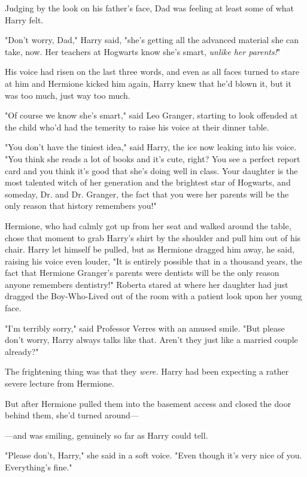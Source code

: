 Judging by the look on his father's face, Dad was feeling at least some of what 
Harry felt.

"Don't worry, Dad," Harry said, "she's getting all the advanced material she 
can take, now. Her teachers at Hogwarts know she's smart, \emph{unlike her 
parents!}"

His voice had risen on the last three words, and even as all faces turned to 
stare at him and Hermione kicked him again, Harry knew that he'd blown it, but 
it was too much, just way too much.

"Of course we know she's smart," said Leo Granger, starting to look offended at 
the child who'd had the temerity to raise his voice at their dinner table.

"You don't have the tiniest idea," said Harry, the ice now leaking into his 
voice. "You think she reads a lot of books and it's cute, right? You see a 
perfect report card and you think it's good that she's doing well in class. 
Your daughter is the most talented witch of her generation and the brightest 
star of Hogwarts, and someday, Dr. and Dr. Granger, the fact that you were her 
parents will be the only reason that history remembers you!"

Hermione, who had calmly got up from her seat and walked around the table, 
chose that moment to grab Harry's shirt by the shoulder and pull him out of his 
chair. Harry let himself be pulled, but as Hermione dragged him away, he said, 
raising his voice even louder, "It is entirely possible that in a thousand 
years, the fact that Hermione Granger's parents were dentists will be the only 
reason anyone remembers dentistry!"
\sbreak
Roberta stared at where her daughter had just dragged the Boy-Who-Lived out of 
the room with a patient look upon her young face.

"I'm terribly sorry," said Professor Verres with an amused smile. "But please 
don't worry, Harry always talks like that. Aren't they just like a married 
couple already?"

The frightening thing was that they \emph{were.}
\sbreak
Harry had been expecting a rather severe lecture from Hermione.

But after Hermione pulled them into the basement access and closed the door 
behind them, she'd turned around---

---and was smiling, genuinely so far as Harry could tell.

"Please don't, Harry," she said in a soft voice. "Even though it's very nice of 
you. Everything's fine."

